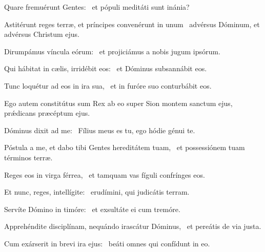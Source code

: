 \item Quare fremuérunt Gentes:~\psstar{} et pópuli meditáti sunt inánia?

\item Astitérunt reges terræ, et príncipes convenérunt in unum~\psstar{} advérsus Dóminum, et advérsus Christum ejus.

\item Dirumpámus víncula eórum:~\psstar{} et projiciámus a nobis jugum ipsórum.

\item Qui hábitat in cælis, irridébit eos:~\psstar{} et Dóminus subsannábit eos.

\item Tunc loquétur ad eos in ira sua,~\psstar{} et in furóre suo conturbábit eos.

\item Ego autem constitútus sum Rex ab eo super Sion montem sanctum ejus,~\psstar{} prǽdicans præcéptum ejus.

\item Dóminus dixit ad me:~\psstar{} Fílius meus es tu, ego hódie génui te.

\item Póstula a me, et dabo tibi Gentes hereditátem tuam,~\psstar{} et possessiónem tuam términos terræ.

\item Reges eos in virga férrea,~\psstar{} et tamquam vas fíguli confrínges eos.

\item Et nunc, reges, intellígite:~\psstar{} erudímini, qui judicátis terram.

\item Servíte Dómino in timóre:~\psstar{} et exsultáte ei cum tremóre.

\item Apprehéndite disciplínam, nequándo irascátur Dóminus,~\psstar{} et pereátis de via justa.

\item Cum exárserit in brevi ira ejus:~\psstar{} beáti omnes qui confídunt in eo.
